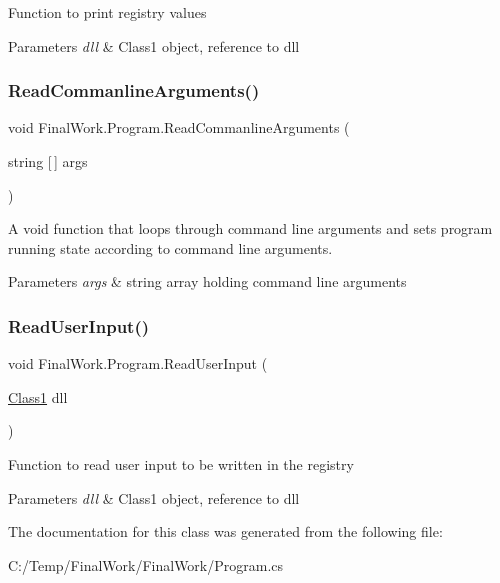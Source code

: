 Function to print registry values 
\begin{DoxyParams}{Parameters}
{\em dll} & Class1 object, reference to dll \\
\hline
\end{DoxyParams}
\mbox{\label{class_final_work_1_1_program_a553c892f82abf7fcfd9057ece85c11f5}} 
\subsubsection{\texorpdfstring{Read\+Commanline\+Arguments()}{ReadCommanlineArguments()}}
{\footnotesize\ttfamily void Final\+Work.\+Program.\+Read\+Commanline\+Arguments (\begin{DoxyParamCaption}\item[{string \mbox{[}$\,$\mbox{]}}]{args }\end{DoxyParamCaption})\hspace{0.3cm}{\ttfamily [private]}}

A void function that loops through command line arguments and sets program running state according to command line arguments. 
\begin{DoxyParams}{Parameters}
{\em args} & string array holding command line arguments \\
\hline
\end{DoxyParams}
\mbox{\label{class_final_work_1_1_program_ab669be7d2c3db874295f7b4256e9aa9f}} 
\subsubsection{\texorpdfstring{Read\+User\+Input()}{ReadUserInput()}}
{\footnotesize\ttfamily void Final\+Work.\+Program.\+Read\+User\+Input (\begin{DoxyParamCaption}\item[{\hyperlink{class_projectdll_1_1_class1}{Class1}}]{dll }\end{DoxyParamCaption})\hspace{0.3cm}{\ttfamily [private]}}

Function to read user input to be written in the registry 
\begin{DoxyParams}{Parameters}
{\em dll} & Class1 object, reference to dll \\
\hline
\end{DoxyParams}


The documentation for this class was generated from the following file\+:\begin{DoxyCompactItemize}
\item 
C\+:/\+Temp/\+Final\+Work/\+Final\+Work/Program.\+cs\end{DoxyCompactItemize}
